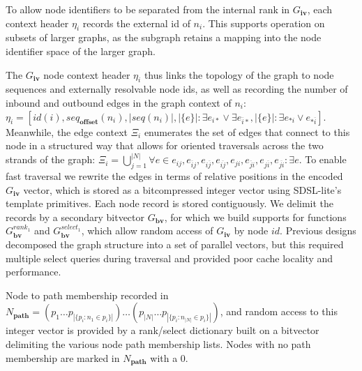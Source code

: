 To allow node identifiers to be separated from the internal rank in $G_\textbf{iv}$, each context header $\eta_i$ records the external id of $n_i$.
This supports operation on subsets of larger graphs, as the subgraph retains a mapping into the node identifier space of the larger graph.

The $G_\textbf{iv}$ node context header $\eta_i$ thus links the topology of the graph to node sequences and externally resolvable node ids, as well as recording the number of inbound and outbound edges in the graph context of
$n_i$: $\eta_i = [ id(i), seq_\textbf{offset}(n_i), |seq(n_i)|, |\{e\}| : \exists e_{i*} \lor \exists e_{\overline{i}*}, |\{e\}| : \exists e_{*i} \lor e_{*\overline{i}} ]$.
Meanwhile, the edge context $\Xi_i$ enumerates the set of edges that connect to this node in a structured way that allows for oriented traversals across the two strands of the graph: $\Xi_i = \bigcup_{j=1}^{|N|} \forall e \in e_{ij}, e_{\overline{i}j}, e_{i\overline{j}}, e_{\overline{ij}}, e_{ji}, e_{\overline{j}i}, e_{j\overline{i}}, e_{\overline{ji}} : \exists e$.
To enable fast traversal we rewrite the edges in terms of relative positions in the encoded $G_\textbf{iv}$ vector, which is stored as a bitcompressed integer vector using SDSL-lite's template primitives.
Each node record is stored contiguously.
We delimit the records by a secondary bitvector $G_\textbf{bv}$, for which we build supports for functions $G_\textbf{bv}^{rank_1}$ and $G_\textbf{bv}^{select_1}$, which allow random access of $G_\textbf{iv}$ by node $id$.
Previous designs decomposed the graph structure into a set of parallel vectors, but this required multiple select queries during traversal and provided poor cache locality and performance.

Node to path membership recorded in $N_\textbf{path} = ( p_1 \ldots p_{|\{p_i : n_1 \in p_i \}|} ) \ldots ( p_{|N|} \ldots p_{|\{p_i : n_{|N|} \in p_i \}|} )$, and random access to this integer vector is provided by a rank/select dictionary built on a bitvector delimiting the various node path membership lists.
Nodes with no path membership are marked in $N_\textbf{path}$ with a 0.

